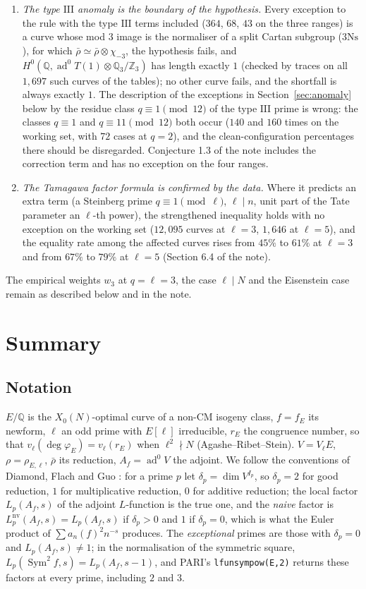\documentclass[11pt]{amsart}
\theoremstyle{definition}
\newcommand{\Q}{\mathbb{Q}}\newcommand{\Z}{\mathbb{Z}}\newcommand{\F}{\mathbb{F}}
\newcommand{\degphi}{\deg\varphi_E}\newcommand{\Gal}{\operatorname{Gal}}\newcommand{\ad}{\operatorname{ad}^0}
\newcommand{\Sym}{\operatorname{Sym}^2}\newcommand{\nv}{\mathrm{nv}}\newcommand{\T}{\mathbb{T}}\newcommand{\Ns}{3\mathrm{Ns}}
\begin{document}
\begin{enumerate}
\item \emph{The type $\mathrm{III}$ anomaly is the boundary of the hypothesis.} Every exception to the rule with the type $\mathrm{III}$ terms included ($364$, $68$, $43$ on the three ranges) is a curve whose mod $3$ image is the normaliser of a split Cartan subgroup ($\Ns$), for which $\bar\rho\simeq\bar\rho\otimes\chi_{-3}$, the hypothesis fails, and $H^0(\Q,\ad T(1)\otimes\Q_3/\Z_3)$ has length exactly $1$ (checked by traces on all $1{,}697$ such curves of the tables); no other curve fails, and the shortfall is always exactly $1$. The description of the exceptions in Section~\ref{sec:anomaly} below by the residue class $q\equiv1\pmod{12}$ of the type $\mathrm{III}$ prime is wrong: the classes $q\equiv1$ and $q\equiv11\pmod{12}$ both occur ($140$ and $160$ times on the working set, with $72$ cases at $q=2$), and the clean-configuration percentages there should be disregarded. Conjecture 1.3 of the note includes the correction term and has no exception on the four ranges.
\item \emph{The Tamagawa factor formula is confirmed by the data.} Where it predicts an extra term (a Steinberg prime $q\equiv1\pmod\ell$, $\ell\mid n$, unit part of the Tate parameter an $\ell$-th power), the strengthened inequality holds with no exception on the working set ($12{,}095$ curves at $\ell=3$, $1{,}646$ at $\ell=5$), and the equality rate among the affected curves rises from $45\%$ to $61\%$ at $\ell=3$ and from $67\%$ to $79\%$ at $\ell=5$ (Section 6.4 of the note).
\end{enumerate}
The empirical weights $w_3$ at $q=\ell=3$, the case $\ell\mid N$ and the Eisenstein case remain as described below and in the note.

\section{Summary}\label{sec:summary}

\subsection{Notation}
$E/\Q$ is the $X_0(N)$-optimal curve of a non-CM isogeny class, $f=f_E$ its newform, $\ell$ an odd prime with $E[\ell]$ irreducible, $r_E$ the congruence number, so that $v_\ell(\degphi)=v_\ell(r_E)$ when $\ell^2\nmid N$ (Agashe--Ribet--Stein). $V=V_\ell E$, $\rho=\rho_{E,\ell}$, $\bar\rho$ its reduction, $A_f=\ad V$ the adjoint. We follow the conventions of Diamond, Flach and Guo \cite[\S1.7.2]{DFG04}: for a prime $p$ let $\delta_p=\dim V^{I_p}$, so $\delta_p=2$ for good reduction, $1$ for multiplicative reduction, $0$ for additive reduction; the local factor $L_p(A_f,s)$ of the adjoint $L$-function is the true one, and the \emph{naive} factor is $L_p^{\nv}(A_f,s)=L_p(A_f,s)$ if $\delta_p>0$ and $1$ if $\delta_p=0$, which is what the Euler product of $\sum a_n(f)^2n^{-s}$ produces. The \emph{exceptional} primes are those with $\delta_p=0$ and $L_p(A_f,s)\ne1$; in the normalisation of the symmetric square, $L_p(\Sym f,s)=L_p(A_f,s-1)$, and PARI's \texttt{lfunsympow(E,2)} returns these factors at every prime, including $2$ and $3$.
\end{document}
